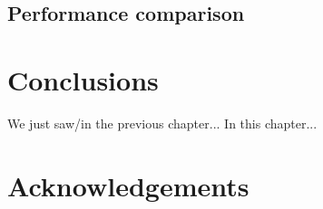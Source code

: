 \documentclass[a4paper, 11pt, oneside]{Thesis}  %
\begin{document}
    \section{Performance comparison}


\chapter{Conclusions}

    We just saw/in the previous chapter...
    In this chapter...

\chapter*{Acknowledgements}


\appendix %



\backmatter

\label{Bibliography}
\end{document}
